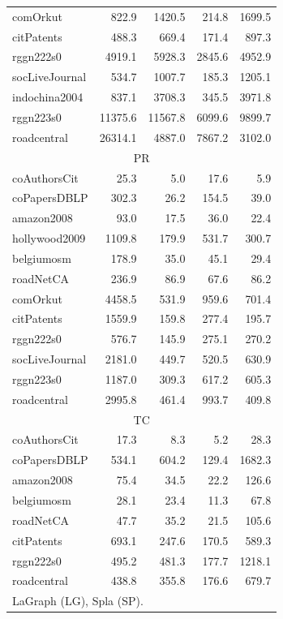 \begin{table}[tbp]
\begin{center}
\begin{tabular}{|l|r|r|r|r|}
    \rowcolor{black!10} comOrkut&822.9&1420.5&214.8&1699.5\\
    \rowcolor{black!2 } citPatents&488.3&669.4&171.4&897.3\\
    \rowcolor{black!10} rggn222s0&4919.1&5928.3&2845.6&4952.9\\
    \rowcolor{black!2 } socLiveJournal&534.7&1007.7&185.3&1205.1\\
    \rowcolor{black!10} indochina2004&837.1&3708.3&345.5&3971.8\\
    \rowcolor{black!2 } rggn223s0&11375.6&11567.8&6099.6&9899.7\\
    \rowcolor{black!10} roadcentral&26314.1&4887.0&7867.2&3102.0\\
    \hline
    \hline
    \multicolumn{5}{|c|}{PR} \\
    \hline
    \rowcolor{black!10} coAuthorsCit&25.3&5.0&17.6&5.9\\
    \rowcolor{black!2 } coPapersDBLP&302.3&26.2&154.5&39.0\\
    \rowcolor{black!10} amazon2008&93.0&17.5&36.0&22.4\\
    \rowcolor{black!2 } hollywood2009&1109.8&179.9&531.7&300.7\\
    \rowcolor{black!10} belgiumosm&178.9&35.0&45.1&29.4\\
    \rowcolor{black!2 } roadNetCA&236.9&86.9&67.6&86.2\\
    \rowcolor{black!10} comOrkut&4458.5&531.9&959.6&701.4\\
    \rowcolor{black!2 } citPatents&1559.9&159.8&277.4&195.7\\
    \rowcolor{black!10} rggn222s0&576.7&145.9&275.1&270.2\\
    \rowcolor{black!2 } socLiveJournal&2181.0&449.7&520.5&630.9\\
    \rowcolor{black!10} rggn223s0&1187.0&309.3&617.2&605.3\\
    \rowcolor{black!2 } roadcentral&2995.8&461.4&993.7&409.8\\
    \hline
    \hline
    \multicolumn{5}{|c|}{TC} \\
    \hline
    \rowcolor{black!10} coAuthorsCit&17.3&8.3&5.2&28.3\\
    \rowcolor{black!2 } coPapersDBLP&534.1&604.2&129.4&1682.3\\
    \rowcolor{black!10} amazon2008&75.4&34.5&22.2&126.6\\
    \rowcolor{black!2 } belgiumosm&28.1&23.4&11.3&67.8\\
    \rowcolor{black!10} roadNetCA&47.7&35.2&21.5&105.6\\
    \rowcolor{black!2 } citPatents&693.1&247.6&170.5&589.3\\
    \rowcolor{black!10} rggn222s0&495.2&481.3&177.7&1218.1\\
    \rowcolor{black!2 } roadcentral&438.8&355.8&176.6&679.7\\
    \hline
    \hline
    \multicolumn{5}{l}{LaGraph (LG), Spla (SP).} \\
    \end{tabular}
    \label{rq3_table}
\end{center}
\end{table}




